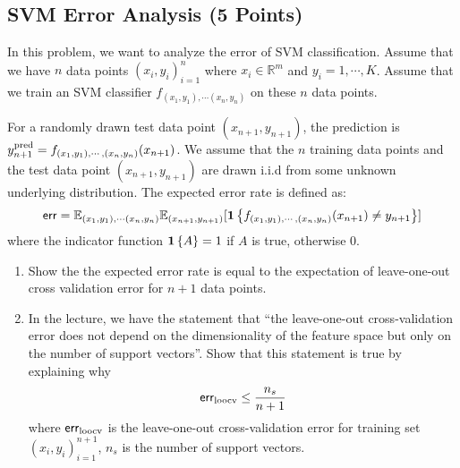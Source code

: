 \subsection{SVM Error Analysis (5 Points)}
In this problem, we want to analyze the error of SVM classification. Assume that we have $n$ data points $(x_i,y_i)_{i=1}^n$ where $x_i\in \mathbb{R}^m$ and $y_i={1,\cdots,K}$. Assume that we train an SVM classifier $f_{(x_1,y_1),\cdots(x_n,y_n)}$ on these $n$ data points.

For a randomly drawn test data point $(x_{n+1},y_{n+1})$, the prediction is $y_{n+1}^{\rm pred} = f_{(x_1,y_1),\cdots,(x_n,y_n)}(x_{n+1})$. We assume that the $n$ training data points and the test data point $(x_{n+1},y_{n+1})$ are drawn i.i.d from some unknown underlying distribution. The expected error rate is defined as:
\begin{align}
{\sf err} = \mathbb{E}_{(x_1,y_1),\cdots(x_n,y_n)} \mathbb{E}_{(x_{n+1},y_{n+1})} [\mathbf{1}\left\lbrace f_{(x_1,y_1),\cdots,(x_n,y_n)}(x_{n+1})\neq y_{n+1} \right\rbrace]
\end{align}
where the indicator function $\mathbf{1}\left\lbrace A \right\rbrace = 1 $ if $ A $ is true, otherwise 0. 
\begin{enumerate}
\item Show the the expected error rate is equal to the expectation of leave-one-out cross validation error for $n+1$ data points.
\item In the lecture, we have the statement that ``the leave-one-out cross-validation error does not depend on the dimensionality of the feature space but only on the number of support vectors''. Show that this statement is true by explaining why
\begin{align}
{\sf err}_{\rm loocv} \le \frac{n_s}{n+1}
\end{align}
where ${\sf err}_{\rm loocv}$ is the leave-one-out cross-validation error for training set $(x_i,y_i)_{i=1}^{n+1}$, $n_s$ is the number of support vectors.
\end{enumerate}